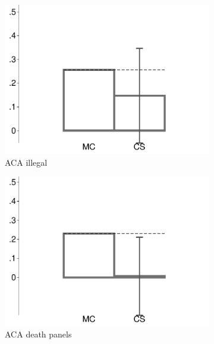 \begin{figure}[t]
\begin{subfigure}{.325\textwidth}
		\includegraphics[width=\textwidth]{../figs/confidence_score_ccd_imc_14k_illegal_study1.pdf}
		\caption{ACA illegal}
	\end{subfigure}	
	\begin{subfigure}{.325\textwidth}\centering
		\includegraphics[width=\textwidth]{../figs/confidence_score_ccd_imc_14k_death_study1.pdf}
		\caption{ACA death panels}
	\end{subfigure}
	\hfill
	\begin{subfigure}{.325\textwidth}\centering

\end{subfigure}
\end{figure}
